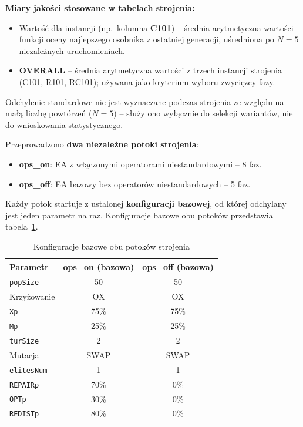 \documentclass[11pt,a4paper]{article}
\begin{document}
\textbf{Miary jakości stosowane w tabelach strojenia:}
\begin{itemize}
    \item Wartość dla instancji (np.\ kolumna \textbf{C101}) -- średnia arytmetyczna
          wartości funkcji oceny najlepszego osobnika z ostatniej generacji,
          uśredniona po $N=5$ niezależnych uruchomieniach.
    \item \textbf{OVERALL} -- średnia arytmetyczna wartości z trzech instancji
          strojenia (C101, R101, RC101); używana jako kryterium wyboru zwycięzcy fazy.
\end{itemize}

Odchylenie standardowe nie jest wyznaczane podczas strojenia ze względu na
małą liczbę powtórzeń ($N=5$) -- służy ono wyłącznie do selekcji wariantów,
nie do wnioskowania statystycznego.

Przeprowadzono \textbf{dwa niezależne potoki strojenia}:
\begin{itemize}
    \item \textbf{ops\_on}: EA z włączonymi operatorami niestandardowymi -- 8 faz.
    \item \textbf{ops\_off}: EA bazowy bez operatorów niestandardowych -- 5 faz.
\end{itemize}

Każdy potok startuje z ustalonej \textbf{konfiguracji bazowej}, od której odchylany
jest jeden parametr na raz. Konfiguracje bazowe obu potoków przedstawia tabela~\ref{tab:base}.

\begin{table}[H]
\centering
\caption{Konfiguracje bazowe obu potoków strojenia}
\label{tab:base}
\begin{tabular}{lcc}
\toprule
Parametr & ops\_on (bazowa) & ops\_off (bazowa) \\
\midrule
\texttt{popSize}   & 50    & 50 \\
Krzyżowanie        & OX    & OX \\
\texttt{Xp}        & 75\%  & 75\% \\
\texttt{Mp}        & 25\%  & 25\% \\
\texttt{turSize}   & 2     & 2 \\
Mutacja            & SWAP  & SWAP \\
\texttt{elitesNum} & 1     & 1 \\
\texttt{REPAIRp}   & 70\%  & 0\% \\
\texttt{OPTp}      & 30\%  & 0\% \\
\texttt{REDISTp}   & 80\%  & 0\% \\
\bottomrule
\end{tabular}
\end{table}
\end{document}
